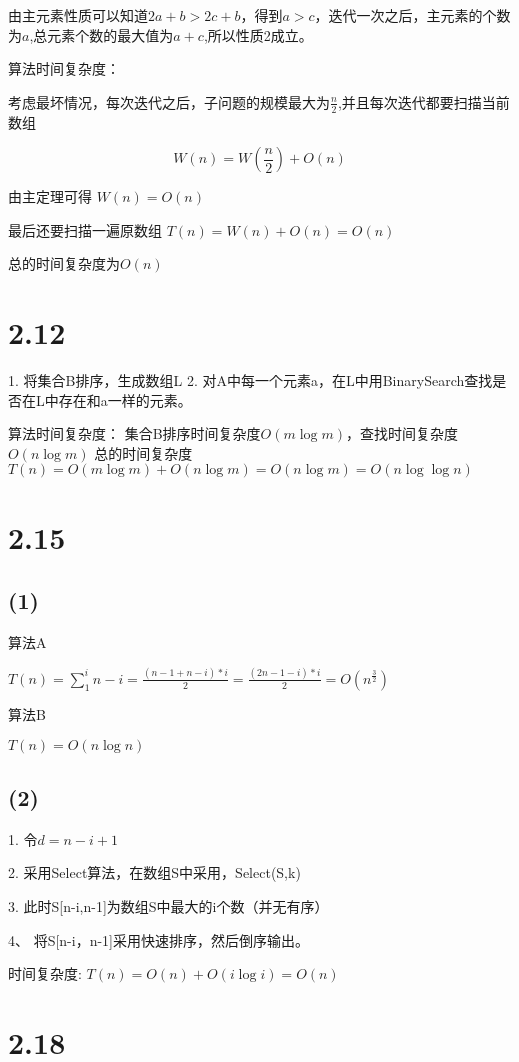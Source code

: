\documentclass[a4paper]{article}
\begin{document}
		由主元素性质可以知道$2a+b > 2c+ b$，得到$a>c$，迭代一次之后，主元素的个数为$a$,总元素个数的最大值为$a+c$,所以性质2成立。

	算法时间复杂度：

	考虑最坏情况，每次迭代之后，子问题的规模最大为$\frac{n}{2}$,并且每次迭代都要扫描当前数组

	$$W(n)=W(\frac{n}{2})+O(n)$$

	由主定理可得 $W(n) = O(n)$

	最后还要扫描一遍原数组 $T(n) = W(n) +O(n) =O(n)$

	总的时间复杂度为$O(n)$

\section*{2.12}
1. 将集合B排序，生成数组L
2. 对A中每一个元素a，在L中用BinarySearch查找是否在L中存在和a一样的元素。

算法时间复杂度：
	集合B排序时间复杂度$O(m \log m)$，查找时间复杂度$O(n \log m)$
	总的时间复杂度$T(n)=O(m \log m) + O(n \log m) = O(n \log m) =O (n \log \log n)$

\section*{2.15}
\subsection*{(1)}
算法A 

$T(n) = \sum_{1}^{i}{n-i}=\frac{(n-1+n-i)*i}{2}=\frac{(2n-1-i)*i}{2}=O(n^{\frac{3}{2}})$

算法B

$T(n) = O(n \log n )$
\subsection*{(2)}

1. 令$d=n-i+1$

2. 采用Select算法，在数组S中采用，Select(S,k)

3. 此时S[n-i,n-1]为数组S中最大的i个数（并无有序）

4、 将S[n-i，n-1]采用快速排序，然后倒序输出。

时间复杂度:
	$T(n) = O(n)+O(i\log i) = O(n)$

\section*{2.18}
\end{document}
